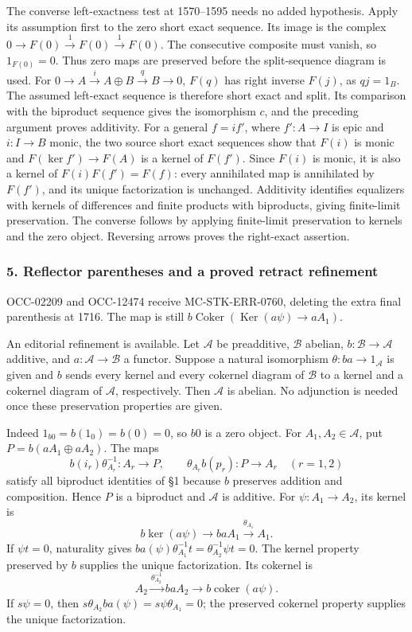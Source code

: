 The converse left-exactness test at 1570--1595 needs no added hypothesis. Apply its assumption first to the zero short exact sequence. Its image is the complex \(0\to F(0)\xrightarrow1 F(0)\xrightarrow1 F(0)\). The consecutive composite must vanish, so \(1_{F(0)}=0\). Thus zero maps are preserved before the split-sequence diagram is used. For \(0\to A\xrightarrow i A\oplus B\xrightarrow q B\to0\), \(F(q)\) has right inverse \(F(j)\), as \(qj=1_B\). The assumed left-exact sequence is therefore short exact and split. Its comparison with the biproduct sequence gives the isomorphism \(c\), and the preceding argument proves additivity. For a general \(f=i f'\), where \(f':A\to I\) is epic and \(i:I\to B\) monic, the two source short exact sequences show that \(F(i)\) is monic and \(F(\ker f')\to F(A)\) is a kernel of \(F(f')\). Since \(F(i)\) is monic, it is also a kernel of \(F(i)F(f')=F(f)\): every annihilated map is annihilated by \(F(f')\), and its unique factorization is unchanged. Additivity identifies equalizers with kernels of differences and finite products with biproducts, giving finite-limit preservation. The converse follows by applying finite-limit preservation to kernels and the zero object. Reversing arrows proves the right-exact assertion.

\subsubsection{5. Reflector parentheses and a proved retract refinement}\label{reflector-parentheses-and-a-proved-retract-refinement}

OCC-02209 and OCC-12474 receive MC-STK-ERR-0760, deleting the extra final parenthesis at 1716. The map is still \(b\operatorname{Coker}(\operatorname{Ker}(a\psi)\to aA_1)\).

An editorial refinement is available. Let \(\mathcal A\) be preadditive, \(\mathcal B\) abelian, \(b:\mathcal B\to\mathcal A\) additive, and \(a:\mathcal A\to\mathcal B\) a functor. Suppose a natural isomorphism \(\theta:ba\to1_{\mathcal A}\) is given and \(b\) sends every kernel and every cokernel diagram of \(\mathcal B\) to a kernel and a cokernel diagram of \(\mathcal A\), respectively. Then \(\mathcal A\) is abelian. No adjunction is needed once these preservation properties are given.

Indeed \(1_{b0}=b(1_0)=b(0)=0\), so \(b0\) is a zero object. For \(A_1,A_2\in\mathcal A\), put \(P=b(aA_1\oplus aA_2)\). The maps \[
b(i_r)\theta_{A_r}^{-1}:A_r\to P,\qquad
\theta_{A_r}b(p_r):P\to A_r\quad(r=1,2)
\] satisfy all biproduct identities of §1 because \(b\) preserves addition and composition. Hence \(P\) is a biproduct and \(\mathcal A\) is additive. For \(\psi:A_1\to A_2\), its kernel is \[
b\ker(a\psi)\longrightarrow baA_1\xrightarrow{\theta_{A_1}}A_1.
\] If \(\psi t=0\), naturality gives \(ba(\psi)\theta_{A_1}^{-1}t=\theta_{A_2}^{-1}\psi t=0\). The kernel property preserved by \(b\) supplies the unique factorization. Its cokernel is \[
A_2\xrightarrow{\theta_{A_2}^{-1}}baA_2
\longrightarrow b\operatorname{coker}(a\psi).
\] If \(s\psi=0\), then \(s\theta_{A_2}ba(\psi)=s\psi\theta_{A_1}=0\); the preserved cokernel property supplies the unique factorization.

